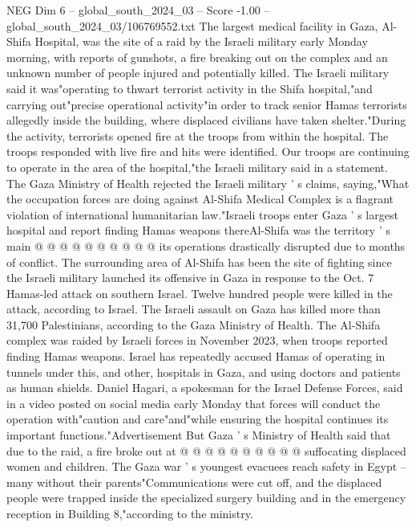 \begin{textsample}{NEG Dim 6 – global\_south\_2024\_03 – Score -1.00 – global\_south\_2024\_03/106769552.txt}  \label{ex:f6_neg_387}
The largest medical facility in Gaza, Al-Shifa Hospital, was the site of a raid by the Israeli military early Monday morning, with reports of gunshots, a fire breaking out on the complex and an unknown number of people injured and potentially killed.
The Israeli military said it was"operating to thwart terrorist activity in the Shifa hospital,"and carrying out"precise operational activity"in order to track senior Hamas terrorists allegedly inside the building, where displaced civilians have taken shelter."During the activity, terrorists opened fire at the troops from within the hospital.
The troops responded with live fire and hits were identified.
Our troops are continuing to operate in the area of the hospital,"the Israeli military said in a statement.
The Gaza Ministry of Health rejected the Israeli military ' s claims, saying,"What the occupation forces are doing against Al-Shifa Medical Complex is a flagrant violation of international humanitarian law."Israeli troops enter Gaza ' s largest hospital and report finding Hamas weapons thereAl-Shifa was the territory ' s main @ @ @ @ @ @ @ @ @ @ its operations drastically disrupted due to months of conflict.
The surrounding area of Al-Shifa has been the site of fighting since the Israeli military launched its offensive in Gaza in response to the Oct. 7 Hamas-led attack on southern Israel.
Twelve hundred people were killed in the attack, according to Israel.
The Israeli assault on Gaza has killed more than 31,700 Palestinians, according to the Gaza Ministry of Health.
The Al-Shifa complex was raided by Israeli forces in November 2023, when troops reported finding Hamas weapons.
Israel has repeatedly accused Hamas of operating in tunnels under this, and other, hospitals in Gaza, and using doctors and patients as human shields.
Daniel Hagari, a spokesman for the Israel Defense Forces, said in a video posted on social media early Monday that forces will conduct the operation with"caution and care"and"while ensuring the hospital continues its important functions."Advertisement But Gaza ' s Ministry of Health said that due to the raid, a fire broke out at @ @ @ @ @ @ @ @ @ @ suffocating displaced women and children.
The Gaza war ' s youngest evacuees reach safety in Egypt -- many without their parents"Communications were cut off, and the displaced people were trapped inside the specialized surgery building and in the emergency reception in Building 8,"according to the ministry.

\end{textsample}
